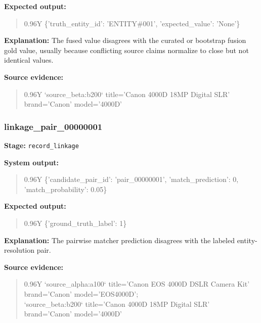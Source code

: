 \documentclass[10pt]{article}
\begin{document}
\textbf{Expected output:}
\begin{quote}
\footnotesize\ttfamily
\begin{tabularx}{0.96\linewidth}{Y}
\{'truth\_entity\_id': 'ENTITY\#001', 'expected\_value': 'None'\}
\end{tabularx}
\end{quote}

\textbf{Explanation:} The fused value disagrees with the curated or bootstrap fusion gold value, usually because conflicting source claims normalize to close but not identical values.

\textbf{Source evidence:}
\begin{quote}
\footnotesize\ttfamily
\begin{tabularx}{0.96\linewidth}{Y}
`source\_beta:b200` title='Canon 4000D 18MP Digital SLR' brand='Canon' model='4000D'
\end{tabularx}
\end{quote}

\subsubsection*{linkage\_pair\_00000001}
\textbf{Stage:} \texttt{record\_linkage}

\textbf{System output:}
\begin{quote}
\footnotesize\ttfamily
\begin{tabularx}{0.96\linewidth}{Y}
\{'candidate\_pair\_id': 'pair\_00000001', 'match\_prediction': 0, 'match\_probability': 0.05\}
\end{tabularx}
\end{quote}

\textbf{Expected output:}
\begin{quote}
\footnotesize\ttfamily
\begin{tabularx}{0.96\linewidth}{Y}
\{'ground\_truth\_label': 1\}
\end{tabularx}
\end{quote}

\textbf{Explanation:} The pairwise matcher prediction disagrees with the labeled entity-resolution pair.

\textbf{Source evidence:}
\begin{quote}
\footnotesize\ttfamily
\begin{tabularx}{0.96\linewidth}{Y}
`source\_alpha:a100` title='Canon EOS 4000D DSLR Camera Kit' brand='Canon' model='EOS4000D'; \\ `source\_beta:b200` title='Canon 4000D 18MP Digital SLR' brand='Canon' model='4000D'
\end{tabularx}
\end{quote}
\end{document}
